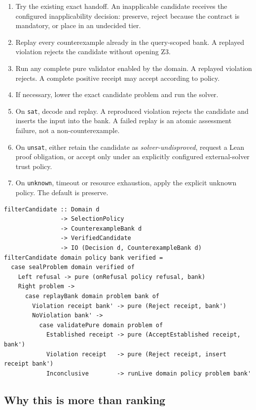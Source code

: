 \documentclass[11pt,oneside]{report}
\begin{document}
\begin{enumerate}[leftmargin=2em]
\item Try the existing exact handoff. An inapplicable candidate receives the configured inapplicability decision: preserve, reject because the contract is mandatory, or place in an undecided tier.
\item Replay every counterexample already in the query-scoped bank. A replayed violation rejects the candidate without opening Z3.
\item Run any complete pure validator enabled by the domain. A replayed violation rejects. A complete positive receipt may accept according to policy.
\item If necessary, lower the exact candidate problem and run the solver.
\item On \texttt{sat}, decode and replay. A reproduced violation rejects the candidate and inserts the input into the bank. A failed replay is an atomic assessment failure, not a non-counterexample.
\item On \texttt{unsat}, either retain the candidate as \emph{solver-undisproved}, request a Lean proof obligation, or accept only under an explicitly configured external-solver trust policy.
\item On \texttt{unknown}, timeout or resource exhaustion, apply the explicit unknown policy. The default is preserve.
\end{enumerate}

\begin{lstlisting}[language=HaskellX,caption={Core hard-filter loop.},label={lst:hard-filter}]
filterCandidate :: Domain d
                -> SelectionPolicy
                -> CounterexampleBank d
                -> VerifiedCandidate
                -> IO (Decision d, CounterexampleBank d)
filterCandidate domain policy bank verified =
  case sealProblem domain verified of
    Left refusal -> pure (onRefusal policy refusal, bank)
    Right problem ->
      case replayBank domain problem bank of
        Violation receipt bank' -> pure (Reject receipt, bank')
        NoViolation bank' ->
          case validatePure domain problem of
            Established receipt -> pure (AcceptEstablished receipt, bank')
            Violation receipt   -> pure (Reject receipt, insert receipt bank')
            Inconclusive        -> runLive domain policy problem bank'
\end{lstlisting}

\subsection{Why this is more than ranking}
\end{document}
